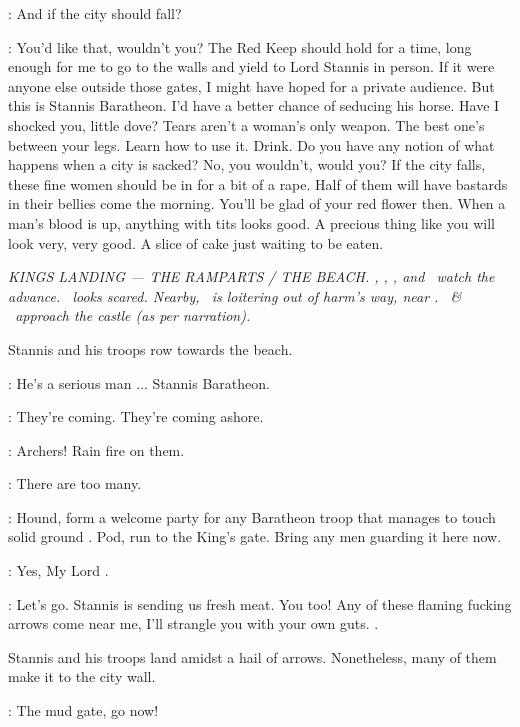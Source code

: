 \SANSA: And if the city should fall? 

\CERSEI: You'd like that, wouldn't you? 
The Red Keep should hold for a time, long enough for me to go to the walls and yield to Lord Stannis in person. 
If it were anyone else outside those gates, I might have hoped for a private audience. 
But this is Stannis Baratheon. 
I'd have a better chance of seducing his horse. 
Have I shocked you, little dove? 
Tears aren't a woman's only weapon. 
The best one's between your legs. 
Learn how to use it. Drink. 
Do you have any notion of what happens when a city is sacked? 
No, you wouldn't, would you? 
If the city falls, these fine women should be in for a bit of a rape. 
Half of them will have bastards in their bellies come the morning. 
You'll be glad of your red flower then. 
When a man's blood is up, anything with tits looks good. 
A precious thing like you will look very, very good. 
A slice of cake just waiting to be eaten. 

\scene

\textit{KINGS LANDING --- THE RAMPARTS / THE BEACH. \TYRION, \JOFFREY,
\PODRICK, and \HOUND ~watch the advance. \JOFFREY ~looks
scared. Nearby, \LANCEL ~is loitering out of harm's way,
near \SERGEANT. \STANNIS ~\& \CAPTAIN ~approach the castle (as per
narration).}

\n Stannis and his troops row towards the beach.

\TYRION: He's a serious man $\ldots$ Stannis Baratheon. 

\JOFFREY: They're coming. They're coming ashore. 

\TYRION: Archers! Rain fire on them. 

\JOFFREY: There are too many. 

\TYRION: Hound, form a welcome party for any Baratheon troop that
manages to touch solid ground .
Pod, run to the King's gate. 
Bring any men guarding it here now. 

\PODRICK: Yes, My Lord .

\HOUND: Let's go. Stannis is sending us fresh meat.  You too! 
Any of these flaming fucking arrows come near me, I'll strangle you
with your own guts. .

\n Stannis and his troops land amidst a hail of arrows. Nonetheless,
many of them make it to the city wall.

\STANNIS: The mud gate, go now! 

